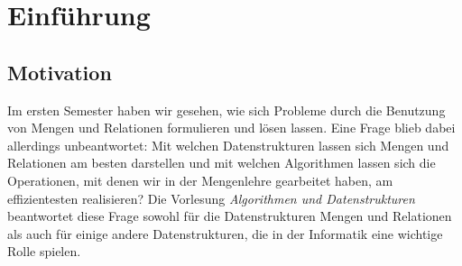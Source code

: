 \chapter{Einf\"uhrung}
\section{Motivation}
Im ersten Semester haben wir gesehen, wie sich Probleme durch die Benutzung von Mengen und
Relationen formulieren und l\"osen lassen.  Eine Frage blieb dabei allerdings unbeantwortet:
Mit welchen Datenstrukturen lassen sich Mengen und Relationen am besten darstellen und mit welchen
Algorithmen lassen sich die Operationen, mit denen wir in der Mengenlehre gearbeitet haben, am
effizientesten realisieren? 
Die Vorlesung \emph{Algorithmen und Datenstrukturen} beantwortet diese Frage sowohl f\"ur die
Datenstrukturen Mengen und Relationen als auch f\"ur einige andere Datenstrukturen, die in der
Informatik eine wichtige Rolle spielen.

